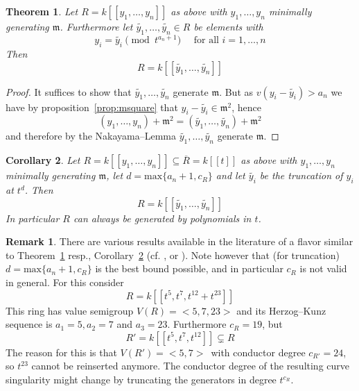 \documentclass[12pt]{amsart}
\theoremstyle{plain}%
\newtheorem{satz}{Theorem}[section]
\newtheorem{Corollary}[satz]{Corollary}
\theoremstyle{definition}
\newtheorem{notiz}{Remark}[section]
\renewcommand{\(}{\left(}
\renewcommand{\)}{\right)}
\begin{document}
\begin{satz}\label{thm:rep_chg}
Let $R = k[[y_1, \ldots, y_n]]$ as above with $y_1, \ldots, 
y_n$ minimally generating $\mathfrak m$. Furthermore let 
$\widetilde{y_1}, \ldots, \widetilde{y_n} \in R$ be elements 
with 
	$$ y_i = \widetilde{y_i} \pmod{t^{a_n+1}} \quad \text{ 
    for all } i = 1, \ldots, n $$
Then 
	$$ R = k[[\widetilde{y_1}, \ldots, \widetilde{y_n} ]] $$
\end{satz}

\begin{proof}
It suffices to show that $\widetilde{y_1}, \ldots, 
\widetilde{y_n}$ generate $\mathfrak m$. But as 
$v(y_i -\widetilde{y_i}) > a_n$ we have by 
proposition~\ref{prop:msquare} that $y_i - \widetilde{y_i} 
\in \mathfrak m^2$, hence
	$$ (y_1, \ldots, y_n) + \mathfrak m^2 = 
    (\widetilde{y_1}, \ldots, \widetilde{y_n}) 
	+ \mathfrak m^2 $$
and therefore by the Nakayama--Lemma $\widetilde{y_1}, 
\ldots, \widetilde{y_n}$ generate $\mathfrak m$. 
\end{proof}

\begin{Corollary}\label{cor:rep_trunc}
Let $R = k[[y_1, \ldots, y_n]] \subseteq \overline{R} 
= k[[t]]$ as above with $y_1, \ldots, y_n$ 
minimally generating $\mathfrak m$, let $d = 
\mathrm{max}\{a_n+1,c_R\}$ and let 
$\widetilde{y_i}$ be the truncation of $y_i$ at $t^d$. Then 
	$$ R =  k[[\widetilde{y_1}, \ldots, \widetilde{y_n} ]] $$
In particular $R$ can always be generated by polynomials in 
$t$.
\end{Corollary}

\begin{notiz}
There are various results available in the literature of a 
flavor similar to Theorem~\ref{thm:rep_chg} resp., 
Corollary~\ref{cor:rep_trunc} (cf. \cite[(1.1)]{CC}, 
or \cite[(2.1)]{Ca}). Note however that (for truncation)
$d = \mathrm{max}\{a_n+1, c_R\}$ is the best bound possible, 
and in particular $c_R$ is not valid in general. For this 
consider 
	$$ R = k[[t^5,t^7,t^{12}+t^{23}]] $$
This ring has value semigroup $V(R) = <5,7,23>$ and its 
Herzog--Kunz sequence is $a_1 = 5, a_2 = 7$ and $a_3 = 23$. 
Furthermore $c_R = 19$, but 
	$$ R' = k[[t^5, t^7,t^{12}]] \subsetneq R $$ 
The reason for this is that $V(R') = <5,7>\,$ with conductor 
degree $c_{R'} = 24$, so $t^{23}$ cannot be reinserted 
anymore.  The conductor degree of the resulting 
curve singularity might change by truncating the generators 
in degree $t^{c_R}$.
\end{notiz}
\end{document}
